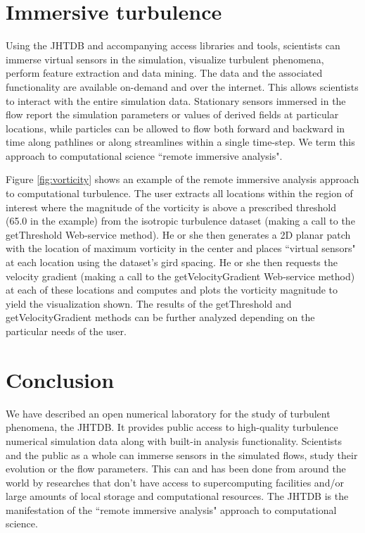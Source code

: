 \documentclass[10pt,twocolumn]{article}
\begin{document}
\section{Immersive turbulence}
Using the JHTDB and accompanying access libraries and tools, scientists can immerse virtual sensors in the simulation, visualize turbulent phenomena, 
perform feature extraction and data mining. The data and the associated functionality are available on-demand and over the internet. This allows scientists 
to interact with the entire simulation data. Stationary sensors immersed in the flow report the simulation parameters or values of derived fields at particular 
locations, while particles can be allowed to flow both forward and backward in time along pathlines or along streamlines within a single time-step. 
We term this approach to computational science ``remote immersive analysis".

Figure \ref{fig:vorticity} shows an example of the remote immersive analysis approach to computational turbulence. The user extracts all locations within the
region of interest where the magnitude of the vorticity is above a prescribed threshold (65.0 in the example) from the isotropic turbulence dataset (making 
a call to the getThreshold Web-service method). He or she then generates a 2D planar patch with the location of maximum vorticity in the center and places
``virtual sensors" at each location using the dataset's gird spacing. He or she then requests the velocity gradient (making a call to the getVelocityGradient
Web-service method) at each of these locations and computes and plots the vorticity magnitude to yield the visualization shown. The results of the 
getThreshold and getVelocityGradient methods can be further analyzed depending on the particular needs of the user.

\section{Conclusion}
We have described an open numerical laboratory for the study of turbulent phenomena, the JHTDB. It provides public access to high-quality turbulence 
numerical simulation data along with built-in analysis functionality. Scientists and the public as a whole can immerse sensors in the simulated flows, study
their evolution or the flow parameters. This can and has been done from around the world by researches that don't have access to supercomputing facilities
and/or large amounts of local storage and computational resources. The JHTDB is the manifestation of the ``remote immersive analysis" approach to 
computational science.
\end{document}
